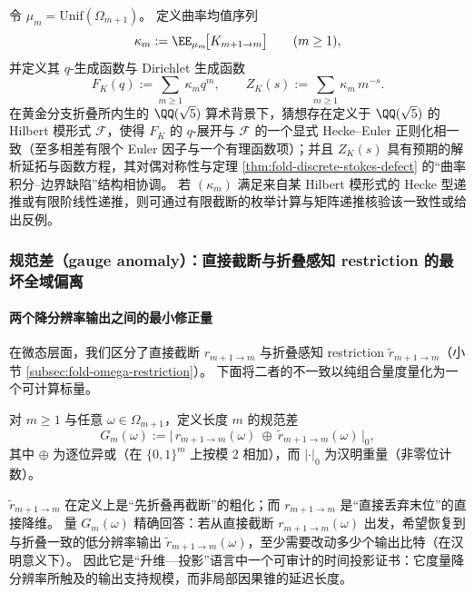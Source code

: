 \begin{conjecture}\label{conj:fold-curvature-hilbert-modularity}
令 \(\mu_m=\mathrm{Unif}(\Omega_{m+1})\)。
定义曲率均值序列
\[
\kappa_m:=\EE_{\mu_m}\!\bigl[K_{m+1\to m}\bigr]\qquad(m\ge 1),
\]
并定义其 \(q\)-生成函数与 Dirichlet 生成函数
\[
F_K(q):=\sum_{m\ge 1}\kappa_m q^m,\qquad
Z_K(s):=\sum_{m\ge 1}\kappa_m\,m^{-s}.
\]
在黄金分支折叠所内生的 \(\QQ(\sqrt5)\) 算术背景下，猜想存在定义于 \(\QQ(\sqrt5)\) 的 Hilbert 模形式 \(\mathcal F\)，使得 \(F_K\) 的 \(q\)-展开与 \(\mathcal F\) 的一个显式 Hecke--Euler 正则化相一致（至多相差有限个 Euler 因子与一个有理函数项）；并且 \(Z_K(s)\) 具有预期的解析延拓与函数方程，其对偶对称性与定理 \ref{thm:fold-discrete-stokes-defect} 的“曲率积分--边界缺陷”结构相协调。
若 \((\kappa_m)\) 满足来自某 Hilbert 模形式的 Hecke 型递推或有限阶线性递推，则可通过有限截断的枚举计算与矩阵递推核验该一致性或给出反例。
\end{conjecture}

\subsubsection{规范差（gauge anomaly）：直接截断与折叠感知 restriction 的最坏全域偏离}\label{subsec:fold-gauge-anomaly}
\paragraph{两个降分辨率输出之间的最小修正量}
在微态层面，我们区分了直接截断 \(r_{m+1\to m}\) 与折叠感知 restriction \(\widetilde r_{m+1\to m}\)（小节 \ref{subsec:fold-omega-restriction}）。
下面将二者的不一致以纯组合量度量化为一个可计算标量。

\begin{definition}\label{def:fold-gauge-anomaly}
对 \(m\ge 1\) 与任意 \(\omega\in\Omega_{m+1}\)，定义长度 \(m\) 的规范差
$$
G_m(\omega)
:=\bigl|\,r_{m+1\to m}(\omega)\ \oplus\ \widetilde r_{m+1\to m}(\omega)\,\bigr|_0,
$$
其中 \(\oplus\) 为逐位异或（在 \(\{0,1\}^m\) 上按模 \(2\) 相加），而 \(|\cdot|_0\) 为汉明重量（非零位计数）。
\end{definition}

\begin{remark}
\(\widetilde r_{m+1\to m}\) 在定义上是“先折叠再截断”的粗化；而 \(r_{m+1\to m}\) 是“直接丢弃末位”的直接降维。
量 \(G_m(\omega)\) 精确回答：若从直接截断 \(r_{m+1\to m}(\omega)\) 出发，希望恢复到与折叠一致的低分辨率输出 \(\widetilde r_{m+1\to m}(\omega)\)，至少需要改动多少个输出比特（在汉明意义下）。
因此它是“升维—投影”语言中一个可审计的时间投影证书：它度量降分辨率所触及的输出支持规模，而非局部因果锥的延迟长度。
\end{remark}

